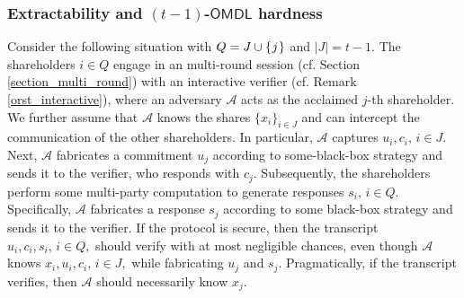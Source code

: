 \documentclass{iacrtrans}
\begin{document}
\subsubsection{Extractability and $(t-1)$-$\mathsf{OMDL}$ hardness}\label{section_extractability_and_omdl}
Consider the following situation with
$Q = J \cup \{\hspace{0.5pt}j\hspace{0.5pt}\}$ and
$|J| = t-1$.
The shareholders $i \in Q$ engage
in an multi-round session
(cf. Section \ref{section_multi_round})
with an interactive verifier
(cf. Remark \ref{orst_interactive}),
where an adversary $\mathcal{A}$
acts as the acclaimed $j$-th shareholder.
We further assume that $\mathcal{A}$
knows the shares $\{x_i\}_{i \in J}$
and can intercept the communication
of the other shareholders.
In particular, $\mathcal{A}$ captures
$u_i, c_i,\hspace{2pt} i \in J$.
Next, $\mathcal{A}$ fabricates a commitment $u_j$
according to some-black-box strategy and sends it to the
verifier, who responds with $c_j$.
Subsequently, the shareholders
perform some multi-party computation
to generate responses $s_i,\hspace{2pt}i\in Q$.
Specifically, $\mathcal{A}$ fabricates a response $s_j$
according to some black-box strategy and sends it to the verifier.
If the protocol is secure, then the transcript
$u_i, c_i, s_i,\hspace{2pt} i \in Q,$
should verify with at most negligible chances,
even though $\mathcal{A}$ knows
$x_i, u_i, c_i,\hspace{2pt} i \in J,$
while fabricating $u_j$ and $s_j$.
Pragmatically, if the transcript verifies,
then $\mathcal{A}$ should necessarily know $x_j$.
\end{document}
